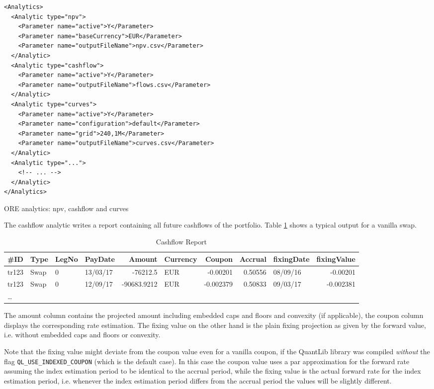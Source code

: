 \documentclass[12pt, a4paper]{article}
\begin{document}
\begin{listing}[H]
\begin{verbatim}
<Analytics>    
  <Analytic type="npv">
    <Parameter name="active">Y</Parameter>
    <Parameter name="baseCurrency">EUR</Parameter>
    <Parameter name="outputFileName">npv.csv</Parameter>
  </Analytic>      
  <Analytic type="cashflow">
    <Parameter name="active">Y</Parameter>
    <Parameter name="outputFileName">flows.csv</Parameter>
  </Analytic>      
  <Analytic type="curves">
    <Parameter name="active">Y</Parameter>
    <Parameter name="configuration">default</Parameter>
    <Parameter name="grid">240,1M</Parameter>
    <Parameter name="outputFileName">curves.csv</Parameter>
  </Analytic>
  <Analytic type="...">
    <!-- ... -->
  </Analytic>      
</Analytics>      
\end{verbatim}
\caption{ORE analytics: npv, cashflow and curves}
\label{lst:ore_analytics}
\end{listing}

The cashflow analytic writes a report containing all future cashflows of the portfolio. Table \ref{cashflowreport} shows
a typical output for a vanilla swap.

\begin{table}[hbt]
\scriptsize
\begin{center}
  \begin{tabular}{l|l|l|l|r|l|r|r|l|r}
\hline
\#ID & Type & LegNo & PayDate & Amount & Currency & Coupon & Accrual & fixingDate & fixingValue \\
\hline
\hline
tr123 & Swap & 0 & 13/03/17 & -76212.5 & EUR & -0.00201 & 0.50556 & 08/09/16 & -0.00201 \\
tr123 & Swap & 0 & 12/09/17 & -90683.9212 & EUR & -0.002379 & 0.50833 & 09/03/17 & -0.002381 \\
\ldots
\end{tabular}
\caption{Cashflow Report}
\label{cashflowreport}
\end{center}
\end{table}

The amount column contains the projected amount including embedded caps and floors and convexity (if applicable), the
coupon column displays the corresponding rate estimation. The fixing value on the other hand is the plain fixing
projection as given by the forward value, i.e. without embedded caps and floors or convexity.

Note that the fixing value might deviate from the coupon value even for a vanilla coupon, if the QuantLib library was
compiled {\em without} the flag \verb+QL_USE_INDEXED_COUPON+ (which is the default case). In this case the coupon value
uses a par approximation for the forward rate assuming the index estimation period to be identical to the accrual
period, while the fixing value is the actual forward rate for the index estimation period, i.e. whenever the index estimation
period differs from the accrual period the values will be slightly different.
\end{document}
